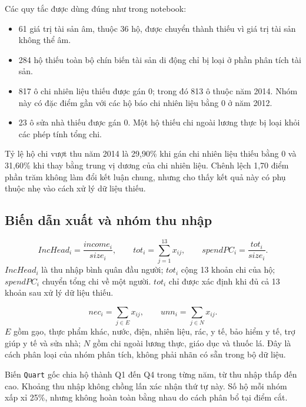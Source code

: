 \documentclass[11pt,a4paper]{article}
\begin{document}
Các quy tắc được dùng đúng như trong notebook:

\begin{itemize}[leftmargin=1.35em,itemsep=3pt,topsep=2pt]
  \item 61 giá trị tài sản âm, thuộc 36 hộ, được chuyển thành thiếu vì giá trị tài sản không thể âm.
  \item 284 hộ thiếu toàn bộ chín biến tài sản di động chỉ bị loại ở phần phân tích tài sản.
  \item 817 ô chi nhiên liệu thiếu được gán 0; trong đó 813 ô thuộc năm 2014. Nhóm này có đặc điểm gần với các hộ báo chi nhiên liệu bằng 0 ở năm 2012.
  \item 23 ô sửa nhà thiếu được gán 0. Một hộ thiếu chi ngoài lương thực bị loại khỏi các phép tính tổng chi.
\end{itemize}

\begin{luuy}
Tỷ lệ hộ chi vượt thu năm 2014 là 29,90\% khi gán chi nhiên liệu thiếu bằng 0 và 31,60\% khi thay bằng trung vị dương của chi nhiên liệu. Chênh lệch 1,70 điểm phần trăm không làm đổi kết luận chung, nhưng cho thấy kết quả này có phụ thuộc nhẹ vào cách xử lý dữ liệu thiếu.
\end{luuy}

\subsection{Biến dẫn xuất và nhóm thu nhập}

\begin{congthuc}
\[
 IncHead_i=\frac{income_i}{size_i},\qquad
 tot_i=\sum_{j=1}^{13}x_{ij},\qquad
 spendPC_i=\frac{tot_i}{size_i}.
\]
$IncHead_i$ là thu nhập bình quân đầu người; $tot_i$ cộng 13 khoản chi của hộ; $spendPC_i$ chuyển tổng chi về một người. $tot_i$ chỉ được xác định khi đủ cả 13 khoản sau xử lý dữ liệu thiếu.

\[
 nec_i=\sum_{j\in E}x_{ij},\qquad
 unn_i=\sum_{j\in N}x_{ij}.
\]
$E$ gồm gạo, thực phẩm khác, nước, điện, nhiên liệu, rác, y tế, bảo hiểm y tế, trợ giúp y tế và sửa nhà; $N$ gồm chi ngoài lương thực, giáo dục và thuốc lá. Đây là cách phân loại của nhóm phân tích, không phải nhãn có sẵn trong bộ dữ liệu.
\end{congthuc}

Biến \texttt{Quart} gốc chia hộ thành Q1 đến Q4 trong từng năm, từ thu nhập thấp đến cao. Khoảng thu nhập không chồng lấn xác nhận thứ tự này. Số hộ mỗi nhóm xấp xỉ 25\%, nhưng không hoàn toàn bằng nhau do cách phân bổ tại điểm cắt.
\end{document}

